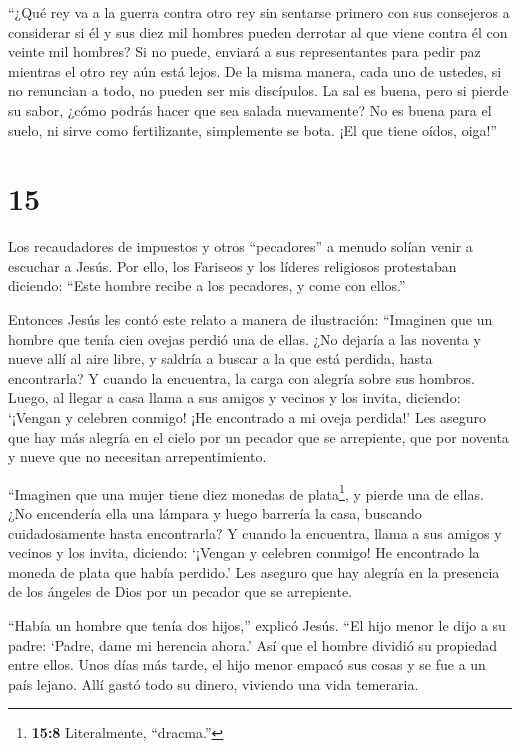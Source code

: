  ``¿Qué rey va a la guerra contra otro rey sin sentarse
primero con sus consejeros a considerar si él y sus diez mil hombres
pueden derrotar al que viene contra él con veinte mil hombres?
 Si no puede, enviará a sus representantes para pedir paz
mientras el otro rey aún está lejos.  De la misma manera,
cada uno de ustedes, si no renuncian a todo, no pueden ser mis
discípulos.  La sal es buena, pero si pierde su sabor,
¿cómo podrás hacer que sea salada nuevamente?  No es buena
para el suelo, ni sirve como fertilizante, simplemente se bota. ¡El que
tiene oídos, oiga!''

\hypertarget{section-14}{%
\section{15}\label{section-14}}

 Los recaudadores de impuestos y otros ``pecadores'' a
menudo solían venir a escuchar a Jesús.  Por ello, los
Fariseos y los líderes religiosos protestaban diciendo: ``Este hombre
recibe a los pecadores, y come con ellos.''

 Entonces Jesús les contó este relato a manera de
ilustración:  ``Imaginen que un hombre que tenía cien ovejas
perdió una de ellas. ¿No dejaría a las noventa y nueve allí al aire
libre, y saldría a buscar a la que está perdida, hasta encontrarla?
 Y cuando la encuentra, la carga con alegría sobre sus
hombros.  Luego, al llegar a casa llama a sus amigos y
vecinos y los invita, diciendo: `¡Vengan y celebren conmigo! ¡He
encontrado a mi oveja perdida!'  Les aseguro que hay más
alegría en el cielo por un pecador que se arrepiente, que por noventa y
nueve que no necesitan arrepentimiento.

 ``Imaginen que una mujer tiene diez monedas de
plata\footnote{\textbf{15:8} Literalmente, ``dracma.''}, y pierde una de
ellas. ¿No encendería ella una lámpara y luego barrería la casa,
buscando cuidadosamente hasta encontrarla?  Y cuando la
encuentra, llama a sus amigos y vecinos y los invita, diciendo: `¡Vengan
y celebren conmigo! He encontrado la moneda de plata que había perdido.'
 Les aseguro que hay alegría en la presencia de los ángeles
de Dios por un pecador que se arrepiente.

 ``Había un hombre que tenía dos hijos,'' explicó Jesús.
 ``El hijo menor le dijo a su padre: `Padre, dame mi
herencia ahora.' Así que el hombre dividió su propiedad entre ellos.
 Unos días más tarde, el hijo menor empacó sus cosas y se
fue a un país lejano. Allí gastó todo su dinero, viviendo una vida
temeraria.

